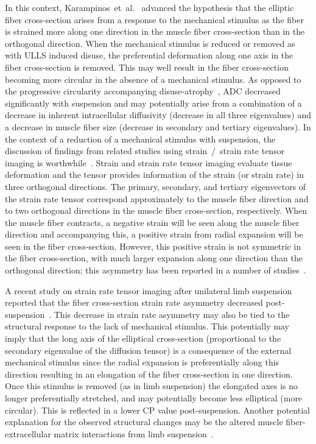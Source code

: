 In this context, Karampinos~et~al.~\cite{RND12} advanced the hypothesis that the elliptic fiber cross-section arises from a response to the mechanical stimulus as the fiber is strained more along one direction in the muscle fiber cross-section than in the orthogonal direction. 
When the mechanical stimulus is reduced or removed as with ULLS induced disuse, the preferential deformation along one axis in the fiber cross-section is removed.
This may well result in the fiber cross-section becoming more circular in the absence of a mechanical stimulus.
As opposed to the progressive circularity accompanying disuse-atrophy~\cite{RND36},
ADC decreased significantly with suspension and may potentially arise from a combination of a decrease in inherent intracellular diffusivity (decrease in all three eigenvalues) and a decrease in muscle fiber size (decrease in secondary and tertiary eigenvalues).
In the context of a reduction of a mechanical stimulus with suspension, the discussion of findings from related studies using strain~/~strain rate tensor imaging is worthwhile~\cite{RNSS4, RNCS4, Malis:2018fr, RNS16}. 
Strain and strain rate tensor imaging evaluate tissue deformation and the tensor provides information of the strain (or strain rate) in three orthogonal directions. 
The primary, secondary, and tertiary eigenvectors of the strain rate tensor correspond approximately to the muscle fiber direction and to two orthogonal directions in the muscle fiber cross-section, respectively. 
When the muscle fiber contracts, a negative strain will be seen along the muscle fiber direction and accompanying this, a positive strain from radial expansion will be seen in the fiber cross-section.
However, this positive strain is not symmetric in the fiber cross-section, with much larger expansion along one direction than the orthogonal direction; this asymmetry has been reported in a number of studies~\cite{Malis:2018fr, RNS16, RNS31}.

A recent study on strain rate tensor imaging after unilateral limb suspension reported that the fiber cross-section strain rate asymmetry decreased post-suspension~\cite{Malis:2018fr}.
This decrease in strain rate asymmetry may also be tied to the structural response to the lack of mechanical stimulus.
This potentially may imply that the long axis of the elliptical cross-section (proportional to the secondary eigenvalue of the diffusion tensor) is a consequence of the external mechanical stimulus since the radial expansion is preferentially along this direction resulting in an elongation of the fiber cross-section in one direction. Once this stimulus is removed (as in limb suspension) the elongated axes is no longer preferentially stretched, and may potentially become less elliptical (more circular).
This is reflected in a lower CP value post-suspension. 
Another potential explanation for the observed structural changes may be the altered muscle fiber-extracellular matrix interactions from limb suspension~\cite{RNSS4, RNCS4}. 

